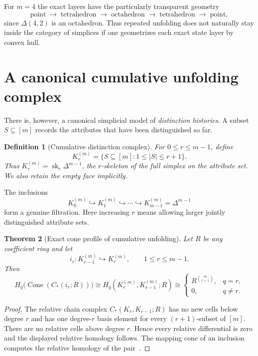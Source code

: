 \documentclass[11pt]{article}
\newtheorem{theorem}{Theorem}[section]
\newtheorem{definition}[theorem]{Definition}
\newcommand{\Cone}{\operatorname{Cone}}
\newcommand{\sk}{\operatorname{sk}}
\begin{document}
For $m=4$ the exact layers have the particularly transparent geometry
\[
\text{point}\;\longrightarrow\;\text{tetrahedron}\;\longrightarrow\;\text{octahedron}\;\longrightarrow\;\text{tetrahedron}\;\longrightarrow\;\text{point},
\]
since $\Delta(4,2)$ is an octahedron.  Thus repeated unfolding does not naturally stay inside the category of simplices if one geometrizes each exact state layer by convex hull.

\section{A canonical cumulative unfolding complex}

There is, however, a canonical simplicial model of \emph{distinction histories}.  A subset $S\subseteq[m]$ records the attributes that have been distinguished so far.

\begin{definition}[Cumulative distinction complex]
For $0\le r\le m-1$, define
\[
K_r^{(m)}=\{S\subseteq[m]:1\le |S|\le r+1\}.
\]
Thus $K_r^{(m)}=\sk_r\Delta^{m-1}$, the $r$-skeleton of the full simplex on the attribute set.  We also retain the empty face implicitly.
\end{definition}

The inclusions
\[
K_0^{(m)}\hookrightarrow K_1^{(m)}\hookrightarrow\cdots\hookrightarrow K_{m-1}^{(m)}=\Delta^{m-1}
\]
form a genuine filtration.  Here increasing $r$ means allowing larger jointly distinguished attribute sets.

\begin{theorem}[Exact cone profile of cumulative unfolding]\label{thm:skeletoncone}
Let $R$ be any coefficient ring and let
\[
i_r:K_{r-1}^{(m)}\hookrightarrow K_r^{(m)},\qquad 1\le r\le m-1.
\]
Then
\[
H_q\bigl(\Cone(C_*(i_r;R))\bigr)
\cong H_q(K_r^{(m)},K_{r-1}^{(m)};R)
\cong
\begin{cases}
R^{\binom{m}{r+1}},&q=r,\\
0,&q\neq r.
\end{cases}
\]
\end{theorem}
\begin{proof}
The relative chain complex $C_*(K_r,K_{r-1};R)$ has no new cells below degree $r$ and has one degree-$r$ basis element for every $(r+1)$-subset of $[m]$.  There are no relative cells above degree $r$.  Hence every relative differential is zero and the displayed relative homology follows.  The mapping cone of an inclusion computes the relative homology of the pair~\cite{Hatcher2002}.
\end{proof}
\end{document}
